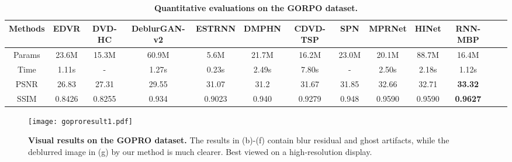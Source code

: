 \documentclass[letterpaper]{article} \usepackage{aaai22}  \usepackage{times}  \usepackage{helvet}  \usepackage{courier}  \usepackage[hyphens]{url}  \usepackage{graphicx} \urlstyle{rm} \def\UrlFont{\rm}  \usepackage{natbib}  \usepackage{caption} \DeclareCaptionStyle{ruled}{labelfont=normalfont,labelsep=colon,strut=off} \frenchspacing  \setlength{\pdfpagewidth}{8.5in}  \setlength{\pdfpageheight}{11in}  \newcommand{\hang}{\textcolor[rgb]{0.98,0.5,0.04}}
\begin{document}
\begin{table*}[!t] 
\centering
\begin{adjustbox}{width=0.95\linewidth}
\begin{tabular}{c|c c c c c c c c c c c c}
    \hline
    {\bf Methods}  & EDVR     & DVD-HC      & DeblurGAN-v2    & ESTRNN     & DMPHN    & CDVD-TSP   & SPN           & MPRNet   & HINet    & RNN-MBP     \\
    \hline
    Params         & 23.6M    & 15.3M       & 60.9M           & 5.6M       & 21.7M    & 16.2M      & 23.0M         & 20.1M    & 88.7M    & 16.4M    \\
    Time           & 1.11s    & -           & 1.27s           & 0.23s      & 2.49s    & 7.80s      & -             & 2.50s    & 2.18s    & 1.12s     \\
    PSNR           & 26.83    & 27.31       & 29.55           & 31.07      & 31.2     & 31.67      & 31.85         & 32.66    & 32.71    & {\bf 33.32}    \\
    SSIM           & 0.8426   & 0.8255      & 0.934           & 0.9023     & 0.940    & 0.9279     & 0.948         & 0.9590   & 0.9590   & {\bf 0.9627}   \\
    \hline
\end{tabular}
\end{adjustbox}
\vspace{-2mm}
\caption{{\bf Quantitative evaluations on the GORPO dataset.}}
\label{goproTable}
\vspace{-3mm}
\end{table*}
\begin{figure*}[!t] 
  \centering
  \texttt{[image: goproresult1.pdf]}
  \vspace{-4mm}
  \caption{\textbf{Visual results on the GOPRO dataset.} The results in (b)-(f) contain blur residual and ghost artifacts, while the deblurred image in (g) by our method is much clearer. Best viewed on a high-resolution display.}
\label{fig:goproResult}
\end{figure*}
\end{document}
